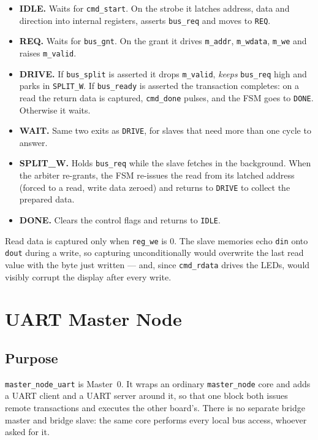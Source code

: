 \documentclass[11pt,a4paper]{article}
\newcommand{\sig}[1]{\texttt{#1}}
\begin{document}
\begin{itemize}
    \item \textbf{IDLE.} Waits for \sig{cmd\_start}. On the strobe it latches
          address, data and direction into internal registers, asserts
          \sig{bus\_req} and moves to \sig{REQ}.
    \item \textbf{REQ.} Waits for \sig{bus\_gnt}. On the grant it drives
          \sig{m\_addr}, \sig{m\_wdata}, \sig{m\_we} and raises \sig{m\_valid}.
    \item \textbf{DRIVE.} If \sig{bus\_split} is asserted it drops
          \sig{m\_valid}, \emph{keeps} \sig{bus\_req} high and parks in
          \sig{SPLIT\_W}. If \sig{bus\_ready} is asserted the transaction
          completes: on a read the return data is captured, \sig{cmd\_done}
          pulses, and the FSM goes to \sig{DONE}. Otherwise it waits.
    \item \textbf{WAIT.} Same two exits as \sig{DRIVE}, for slaves that need
          more than one cycle to answer.
    \item \textbf{SPLIT\_W.} Holds \sig{bus\_req} while the slave fetches in the
          background. When the arbiter re-grants, the FSM re-issues the read
          from its latched address (forced to a read, write data zeroed) and
          returns to \sig{DRIVE} to collect the prepared data.
    \item \textbf{DONE.} Clears the control flags and returns to \sig{IDLE}.
\end{itemize}

Read data is captured only when \sig{reg\_we} is 0. The slave memories echo
\sig{din} onto \sig{dout} during a write, so capturing unconditionally would
overwrite the last read value with the byte just written --- and, since
\sig{cmd\_rdata} drives the LEDs, would visibly corrupt the display after every
write.

\section{UART Master Node}

\subsection{Purpose}

\sig{master\_node\_uart} is Master~0. It wraps an ordinary \sig{master\_node}
core and adds a UART client and a UART server around it, so that one block both
issues remote transactions and executes the other board's. There is no separate
bridge master and bridge slave: the same core performs every local bus access,
whoever asked for it.
\end{document}
